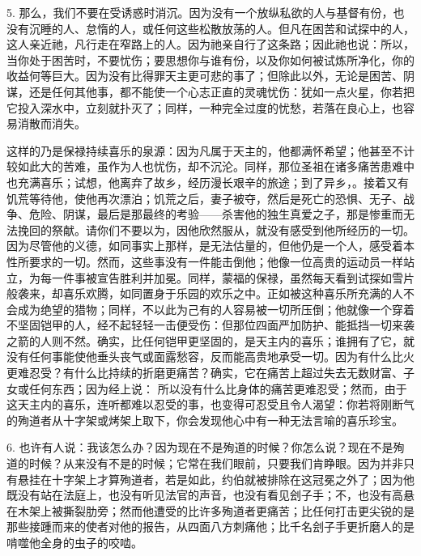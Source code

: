 5. 那么，我们不要在受诱惑时消沉。因为没有一个放纵私欲的人与基督有份，也没有沉睡的人、怠惰的人，或任何这些松散放荡的人。但凡在困苦和试探中的人，这人亲近祂，凡行走在窄路上的人。因为祂亲自行了这条路；因此祂也说：所以，当你处于困苦时，不要忧伤；要思想你与谁有份，以及你如何被试炼所净化，你的收益何等巨大。因为没有比得罪天主更可悲的事了；但除此以外，无论是困苦、阴谋，还是任何其他事，都不能使一个心志正直的灵魂忧伤：犹如一点火星，你若把它投入深水中，立刻就扑灭了；同样，一种完全过度的忧愁，若落在良心上，也容易消散而消失。\par

这样的乃是保禄持续喜乐的泉源：因为凡属于天主的，他都满怀希望；他甚至不计较如此大的苦难，虽作为人也忧伤，却不沉沦。同样，那位圣祖在诸多痛苦患难中也充满喜乐；试想，他离弃了故乡，经历漫长艰辛的旅途；到了异乡，。接着又有饥荒等待他，使他再次漂泊；饥荒之后，妻子被夺，然后是死亡的恐惧、无子、战争、危险、阴谋，最后是那最终的考验——杀害他的独生真爱之子，那是惨重而无法挽回的祭献。请你们不要以为，因他欣然服从，就没有感受到他所经历的一切。因为尽管他的义德，如同事实上那样，是无法估量的，但他仍是一个人，感受着本性所要求的一切。然而，这些事没有一件能击倒他；他像一位高贵的运动员一样站立，为每一件事被宣告胜利并加冕。同样，蒙福的保禄，虽然每天看到试探如雪片般袭来，却喜乐欢腾，如同置身于乐园的欢乐之中。正如被这种喜乐所充满的人不会成为绝望的猎物；同样，不以此为己有的人容易被一切所压倒；他就像一个穿着不坚固铠甲的人，经不起轻轻一击便受伤：但那位四面严加防护、能抵挡一切来袭之箭的人则不然。确实，比任何铠甲更坚固的，是天主内的喜乐；谁拥有了它，就没有任何事能使他垂头丧气或面露愁容，反而能高贵地承受一切。因为有什么比火更难忍受？有什么比持续的折磨更痛苦？确实，它在痛苦上超过失去无数财富、子女或任何东西；因为经上说： 所以没有什么比身体的痛苦更难忍受；然而，由于这天主内的喜乐，连听都难以忍受的事，也变得可忍受且令人渴望：你若将刚断气的殉道者从十字架或烤架上取下，你会发现他心中有一种无法言喻的喜乐珍宝。\par

6. 也许有人说：我该怎么办？因为现在不是殉道的时候？你怎么说？现在不是殉道的时候？从来没有不是的时候；它常在我们眼前，只要我们肯睁眼。因为并非只有悬挂在十字架上才算殉道者，若是如此，约伯就被排除在这冠冕之外了；因为他既没有站在法庭上，也没有听见法官的声音，也没有看见刽子手；不，也没有高悬在木架上被撕裂肋旁；然而他遭受的比许多殉道者更痛苦；比任何打击更尖锐的是那些接踵而来的使者对他的报告，从四面八方刺痛他；比千名刽子手更折磨人的是啃噬他全身的虫子的咬啮。\par

